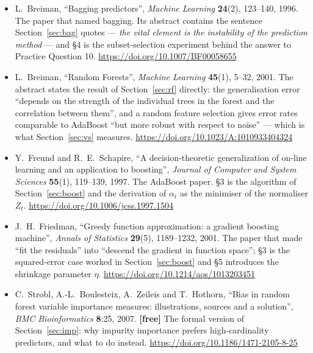 \documentclass[11pt]{article}
\begin{document}
\begin{itemize}[leftmargin=*]
  \item L.\ Breiman, ``Bagging predictors'', \emph{Machine Learning}
    \textbf{24}(2), 123--140, 1996. The paper that named bagging. Its abstract
    contains the sentence Section~\ref{sec:bag} quotes --- \emph{the vital
    element is the instability of the prediction method} --- and \S4 is the
    subset-selection experiment behind the answer to Practice Question 10.
    \url{https://doi.org/10.1007/BF00058655}
  \item L.\ Breiman, ``Random Forests'', \emph{Machine Learning} \textbf{45}(1),
    5--32, 2001. The abstract states the result of Section~\ref{sec:rf}
    directly: the generalisation error ``depends on the strength of the
    individual trees in the forest and the correlation between them'', and a
    random feature selection gives error rates comparable to AdaBoost ``but
    more robust with respect to noise'' --- which is what
    Section~\ref{sec:vs} measures. \url{https://doi.org/10.1023/A:1010933404324}
  \item Y.\ Freund and R.\ E.\ Schapire, ``A decision-theoretic generalization
    of on-line learning and an application to boosting'', \emph{Journal of
    Computer and System Sciences} \textbf{55}(1), 119--139, 1997. The AdaBoost
    paper. \S3 is the algorithm of Section~\ref{sec:boost} and the derivation
    of $\alpha_t$ as the minimiser of the normaliser $Z_t$.
    \url{https://doi.org/10.1006/jcss.1997.1504}
  \item J.\ H.\ Friedman, ``Greedy function approximation: a gradient boosting
    machine'', \emph{Annals of Statistics} \textbf{29}(5), 1189--1232, 2001.
    The paper that made ``fit the residuals'' into ``descend the gradient in
    function space''; \S3 is the squared-error case worked in
    Section~\ref{sec:boost} and \S5 introduces the shrinkage parameter $\eta$.
    \url{https://doi.org/10.1214/aos/1013203451}
  \item C.\ Strobl, A.-L.\ Boulesteix, A.\ Zeileis and T.\ Hothorn, ``Bias in
    random forest variable importance measures: illustrations, sources and a
    solution'', \emph{BMC Bioinformatics} \textbf{8}:25, 2007. \textbf{[free]}
    The formal version of Section~\ref{sec:imp}: why impurity importance
    prefers high-cardinality predictors, and what to do instead.
    \url{https://doi.org/10.1186/1471-2105-8-25}
\end{itemize}

\notesources{\AMLUnitVISources}
\end{document}
